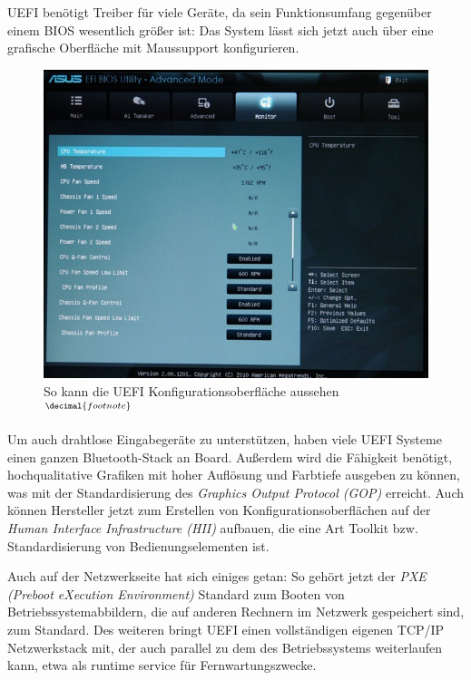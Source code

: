 \documentclass[12pt,ngerman,twopage]{scrartcl}
\begin{document}
UEFI benötigt Treiber für viele Geräte, da sein Funktionsumfang gegenüber einem BIOS wesentlich größer ist: Das System lässt sich jetzt auch über eine grafische Oberfläche mit Maussupport konfigurieren.
\addtocounter{footnote}{1}
\begin{figure}[h]
\includegraphics[width=\linewidth]{ASUS-EFI-screenshot}
\caption{So kann die UEFI Konfigurationsoberfläche aussehen$^{\decimal{footnote}}$}

\end{figure}
Um auch drahtlose Eingabegeräte zu unterstützen, haben viele UEFI Systeme einen ganzen Bluetooth-Stack an Board. Außerdem wird die Fähigkeit benötigt, hochqualitative Grafiken mit hoher Auflösung und Farbtiefe ausgeben zu können, was mit der Standardisierung des \textit{Graphics Output Protocol (GOP)} erreicht. Auch können Hersteller jetzt zum Erstellen von Konfigurationsoberflächen auf der \textit{Human Interface Infrastructure (HII)} aufbauen, die eine Art Toolkit bzw. Standardisierung von Bedienungselementen ist.

Auch auf der Netzwerkseite hat sich einiges getan: So gehört jetzt der \textit{PXE (Preboot eXecution Environment)} Standard zum Booten von Betriebssystemabbildern, die auf anderen Rechnern im Netzwerk gespeichert sind, zum Standard. Des weiteren bringt UEFI einen vollständigen eigenen TCP/IP Netzwerkstack mit, der auch parallel zu dem des Betriebssystems weiterlaufen kann, etwa als runtime service für Fernwartungszwecke.
\end{document}
